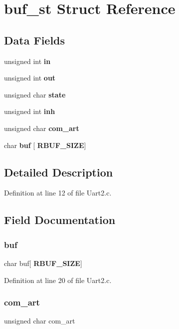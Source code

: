 \section{buf\+\_\+st Struct Reference}
\label{structbuf__st}
\subsection*{Data Fields}
\begin{DoxyCompactItemize}
\item 
unsigned int \textbf{ in}
\item 
unsigned int \textbf{ out}
\item 
unsigned char \textbf{ state}
\item 
unsigned int \textbf{ inh}
\item 
unsigned char \textbf{ com\+\_\+art}
\item 
char \textbf{ buf} [\textbf{ R\+B\+U\+F\+\_\+\+S\+I\+ZE}]
\end{DoxyCompactItemize}


\subsection{Detailed Description}


Definition at line 12 of file Uart2.\+c.



\subsection{Field Documentation}
\mbox{\label{structbuf__st_ae2cfbd13bcf98e8a9a4515998a895af3}} 
\subsubsection{buf}
{\footnotesize\ttfamily char buf[\textbf{ R\+B\+U\+F\+\_\+\+S\+I\+ZE}]}



Definition at line 20 of file Uart2.\+c.

\mbox{\label{structbuf__st_ac3f91e52ff60ee1d05e919dc4d874ab7}} 
\subsubsection{com\+\_\+art}
{\footnotesize\ttfamily unsigned char com\+\_\+art}



